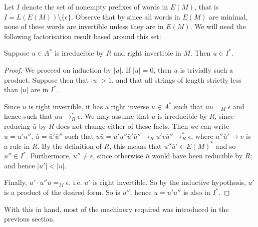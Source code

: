 \documentclass[noindex,noinsetproof,12pt]{lmaths}
\begin{document}
Let $I$ denote the set of nonempty prefixes of words in $E(M)$, that is $I = L(E(M)) \setminus \{\epsilon\}$. Observe that by since all words in $E(M)$ are minimal, none of these words are invertible unless they are in $E(M)$. We will need the following factorisation result based around this set:

\begin{lemma}
	Suppose $u \in A^*$ is irreducible by $R$ and right invertible in $M$. Then $u \in I^*$. \label{lma:factor-I*}
\end{lemma}
\begin{proof}
	We proceed on induction by $|u|$. If $|u| = 0$, then $u$ is trivially such a product. Suppose then that $|u| > 1$, and that all strings of length strictly less than $|u|$ are in $I^*$.

	Since $u$ is right invertible, it has a right inverse $\bar u \in A^*$ such that $u\bar u =_M \epsilon$ and hence such that $u\bar u \to_R^* \epsilon$. We may assume that $\bar u$ is irreducible by $R$, since reducing $\bar u$ by $R$ does not change either of these facts. Then we can write $u = u'u''$, $\bar u = \bar u'\bar u''$ such that $u\bar u = u'u''\bar u'\bar u'' \to_R u'v\bar u'' \to_R^* \epsilon$, where $u''\bar u' \to v$ is a rule in $R$. By the definition of $R$, this means that $u''\bar u' \in E(M)^*$ and so $u'' \in I^*$. Furthermore, $u'' \ne \epsilon$, since otherwise $\bar u$ would have been reducible by $R$; and hence $|u'| < |u|$.

	Finally, $u' \cdot u''\bar u =_M \epsilon$, i.e. $u'$ is right invertible. So by the inductive hypothesis, $u'$ is a product of the desired form. So is $u''$, hence $u = u'u''$ is also in $I^*$.
\end{proof}

With this in hand, most of the machinery required was introduced in the previous section.
\end{document}
